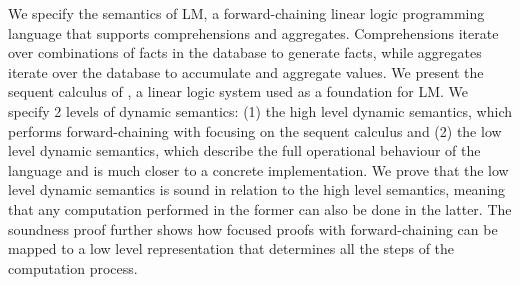 We specify the semantics of LM, a forward-chaining linear logic programming language
that supports comprehensions and aggregates. Comprehensions iterate over
combinations of facts in the database to generate facts, while aggregates
iterate over the database to accumulate and aggregate values.  We present the
sequent calculus of \fragment, a linear logic system used as a foundation for
LM. We specify 2 levels of dynamic semantics: (1) the high level
dynamic semantics, which performs forward-chaining with focusing on the sequent
calculus and (2) the low level dynamic semantics, which describe the full
operational behaviour of the language and is much closer to a concrete
implementation.  We prove that the low level dynamic semantics is sound in
relation to the high level semantics, meaning that any computation performed in
the former can also be done in the latter. The soundness proof further shows how
focused proofs with forward-chaining can be mapped to a low level representation
that determines all the steps of the computation process.
